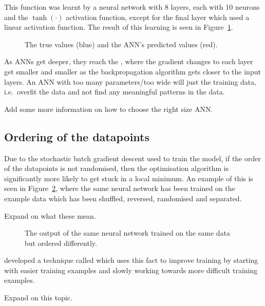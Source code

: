 This function was learnt by a neural network with 8 layers, each with 10 neurons and the \(\tanh(\cdot)\) activation function, except for the final layer which used a linear activation function.
The result of this learning is seen in Figure~\ref{fig:ann-preds}.

\begin{figure}[htbp]
	\centering
	
	\caption{The true values (blue) and the ANN's predicted values (red).}
	\label{fig:ann-preds}
\end{figure}

As \acp{ANN} get deeper, they reach the , where the gradient changes to each layer get smaller and smaller as the backpropagation algorithm gets closer to the input layers.
An \ac{ANN} with too many parameters/too wide will just  the training data, i.e.\ overfit the data and not find any meaningful patterns in the data.

\begin{todo}
	Add some more information on how to choose the right size ANN.
\end{todo}

\subsection{Ordering of the datapoints}

Due to the stochastic batch gradient descent used to train the model, if the order of the datapoints is not randomised, then the optimisation algorithm is significantly more likely to get stuck in a local minimum.
An example of this is seen in Figure~\ref{fig:compare-order}, where the same neural network has been trained on the example data which has been shuffled, reversed, randomised and separated.

\begin{todo}
	Expand on what these mean.
\end{todo}

\begin{figure}[htbp]
	\centering
	
	\caption{The output of the same neural network trained on the same data but ordered differently.}
	\label{fig:compare-order}
\end{figure}

\textcite{bengio2009} developed a technique called  which uses this fact to improve training by starting with easier training examples and slowly working towards more difficult training examples.

\begin{todo}
	Expand on this topic.
\end{todo}
